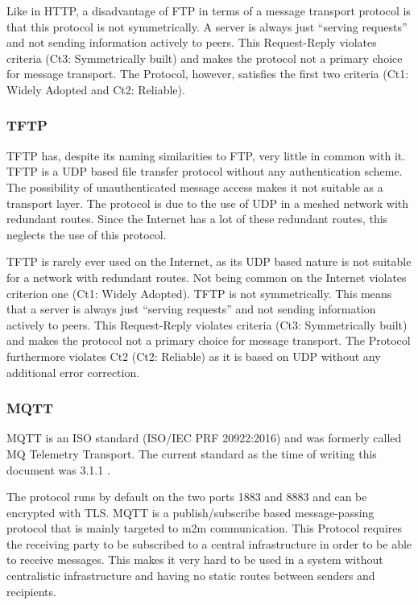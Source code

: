 Like in HTTP, a disadvantage of FTP in terms of a message transport protocol is that this protocol is not symmetrically. A server is always just ``serving requests'' and not sending information actively to peers. This Request-Reply violates criteria (Ct3: Symmetrically built) and makes the protocol not a primary choice for message transport. The Protocol, however, satisfies the first two criteria  (Ct1: Widely Adopted and Ct2: Reliable).

\subsubsection{TFTP}
TFTP has, despite its naming similarities to FTP, very little in common with it. TFTP is a UDP based file transfer protocol without any authentication scheme. The possibility of unauthenticated message access makes it not suitable as a transport layer. The protocol is due to the use of UDP in a meshed network with redundant routes. Since the Internet has a lot of these redundant routes, this neglects the use of this protocol.

TFTP is rarely ever used on the Internet, as its UDP based nature is not suitable for a network with redundant routes. Not being common on the Internet violates criterion one (Ct1: Widely Adopted). TFTP is not symmetrically. This means that a server is always just ``serving requests'' and not sending information actively to peers. This Request-Reply violates criteria (Ct3: Symmetrically built) and makes the protocol not a primary choice for message transport. The Protocol furthermore violates Ct2 (Ct2: Reliable) as it is based on UDP without any additional error correction.

\subsubsection{MQTT}
MQTT is an ISO standard (ISO/IEC PRF 20922:2016) and was formerly called MQ Telemetry Transport. The current standard as the time of writing this document was 3.1.1 \cite{mqtt}. 

The protocol runs by default on the two ports 1883 and 8883 and can be encrypted with TLS. MQTT is a publish/subscribe based message-passing protocol that is mainly targeted to m2m communication. This Protocol requires the receiving party to be subscribed to a central infrastructure in order to be able to receive messages. This makes it very hard to be used in a system without centralistic infrastructure and having no static routes between senders and recipients. 

